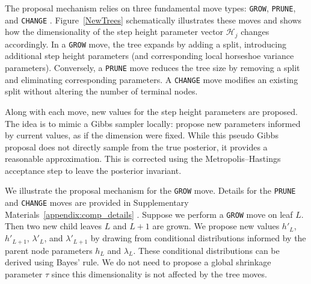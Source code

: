  

The proposal mechanism relies on three fundamental move types: \texttt{GROW}, \texttt{PRUNE}, and \texttt{CHANGE} \citep{BayesianCART}. 
Figure~\ref{NewTrees} schematically illustrates these moves and shows how the dimensionality of the step height parameter vector $\mathcal{H}_j$ changes accordingly. 
In a \texttt{GROW} move, the tree expands by adding a split, introducing additional step height parameters (and corresponding local horseshoe variance parameters). 
Conversely, a \texttt{PRUNE} move reduces the tree size by removing a split and eliminating corresponding parameters. 
A \texttt{CHANGE} move modifies an existing split without altering the number of terminal nodes.


Along with each move, new values for the step height parameters are proposed. 
The idea is to mimic a Gibbs sampler locally: propose new parameters informed by current values, as if the dimension were fixed. 
While this pseudo Gibbs proposal does not directly sample from the true posterior, it provides a reasonable approximation.
This is corrected using the Metropolis--Hastings acceptance step to leave the posterior invariant.

We illustrate the proposal mechanism for the \texttt{GROW} move.
Details for the \texttt{PRUNE} and \texttt{CHANGE} moves are provided in Supplementary Materials~\ref{appendix:comp_details} \citep{supplement}.
Suppose we perform a \texttt{GROW} move on leaf $L$.
Then two new child leaves $L$ and $L+1$ are grown.
We propose new values $h'_L$, $h'_{L+1}$, $\lambda'_L$, and $\lambda'_{L+1}$ by drawing from conditional distributions informed by the parent node parameters $h_L$ and $\lambda_L$.
These conditional distributions can be derived using Bayes' rule.
We do not need to propose a global shrinkage parameter $\tau$ since this dimensionality is not affected by the tree moves.


